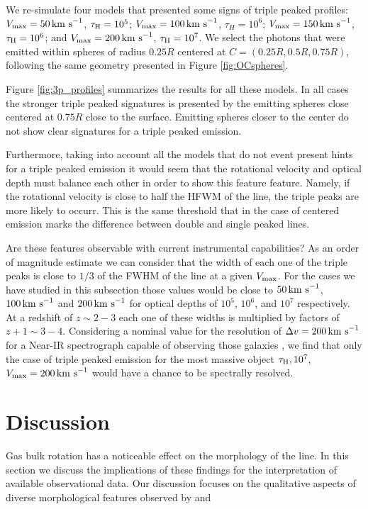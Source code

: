 \documentclass{emulateapj}
\newcommand{\ly}{{\ifmmode{{\rm Ly}\alpha~}\else{Ly$\alpha$~}\fi}}
\newcommand{\kms}{{\ifmmode{{\mathrm{\,km\ s}^{-1}}}\else{\,km~s$^{-1}$}\fi}}
\begin{document}
We re-simulate four models that presented some signs of triple peaked
profiles: $V_{\rm max}=50\kms$, $\tau_{\rm H}=10^{5}$; $V_{\rm
  max}=100\kms$, $\tau_{H}=10^{6}$; $V_{\rm max}=150\kms$, $\tau_{\rm
  H}=10^6$; and $V_{\rm max}=200\kms$, $\tau_{\rm H}=10^{7}$. We
select the photons that were emitted within spheres of radius $0.25R$
centered at $C=(0.25R, 0.5R, 0.75R)$, following the same
geometry presented in Figure \ref{fig:OCspheres}.

Figure \ref{fig:3p_profiles} summarizes the results for all these
models. In all cases the stronger triple peaked signatures is
presented by the emitting spheres close centered at $0.75R$ close to
the surface. Emitting spheres closer to the center do not show clear
signatures for a triple peaked emission.

Furthermore, taking into account all the models that do not event present hints for
a triple peaked emission it would seem that the rotational velocity
and optical depth must balance each other in order to show this feature
feature. Namely, if the rotational velocity is close to half the HFWM
of the line, the triple peaks are more likely to occurr. This is the
same threshold that in the case of centered emission marks the
difference between double and single peaked lines.


Are these features observable with current instrumental capabilities?
As an order of magnitude estimate we can consider that the width of
each one of the triple peaks is close to $1/3$ of the FWHM of the line
at a given $V_{\rm max}$. For the cases we have studied in this
subsection those values would be close to $50\kms$, $100\kms$ and
$200\kms$ for optical depths of $10^5$, $10^6$, and $10^7$
respectively. At a redshift of $z\sim 2-3$ each one of these widths
is multiplied by factors of $z+1\sim 3-4$. Considering a nominal value
for the resolution of $\Delta v=200\kms$ for a Near-IR spectrograph capable of observing
those galaxies \citep{Kulas12}, we find that only the case of triple
peaked emission for the most massive object $\tau_{\rm H}, 10^{7}$,
$V_{\rm max}=200\kms$ would have a chance to be spectrally resolved. 


\section{Discussion}
\label{sec:discussion}

Gas bulk rotation has a noticeable effect on the morphology of the
 \ly line. In this section we discuss the implications of these
 findings for the interpretation of available observational data. Our
 discussion focuses on the qualitative aspects of diverse
 morphological features observed by \cite{Kulas12} and \cite{Yamada2012}
\end{document}
